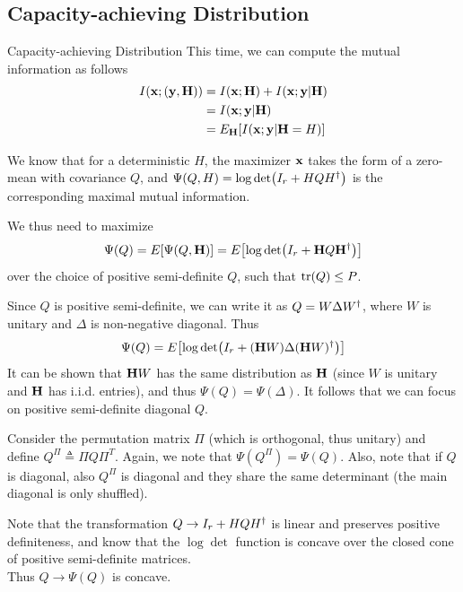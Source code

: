\subsection{Capacity-achieving Distribution}
\begin{frame}[allowframebreaks]{Capacity-achieving Distribution}
This time, we can compute the mutual information as follows
\begin{align*}
\begin{split}
I(\vb{x;(y,H)}) &= I(\vb{x;H}) + I(\vb{x;y|H})\\
&= I(\vb{x;y|H})\\
&= \Exp[\vb{H}]{I(\vb{x;y|H}=H)}
\end{split}
\end{align*}

We know that for a deterministic $H$, the maximizer $\vb{x}$ takes the form of a zero-mean \cscg{} with covariance $Q$, and $\Psi(Q,H) = \log\det(I_r + HQ\herm{H})$ is the corresponding maximal mutual information.

\medskip
We thus need to maximize
$$\Psi(Q) = \Exp{\Psi(Q,\vb{H})} = \Exp{\log\det(I_r + \vb{H}Q\herm{\vb{H}})}$$
over the choice of positive semi-definite $Q$, such that $\tr(Q)\leq P$.

\framebreak

Since $Q$ is positive semi-definite, we can write it as $Q = W\Delta\herm{W}$, where $W$ is unitary and $\Delta$ is non-negative diagonal. Thus
$$\Psi(Q) = \Exp{\log\det(I_r + (\vb{H}W)\Delta\herm{(\vb{H}W)})}$$
It can be shown that $\vb{H}W$ has the same distribution as $\vb{H}$ (since $W$ is unitary and $\vb{H}$ has i.i.d. entries), and thus $\Psi(Q)=\Psi(\Delta)$. It follows that we can focus on positive semi-definite diagonal $Q$.

\medskip
Consider the permutation matrix $\Pi$ (which is orthogonal, thus unitary) and define $Q^\Pi \triangleq \Pi Q \Pi^T$. Again, we note that $\Psi(Q^\Pi) = \Psi(Q)$. Also, note that if $Q$ is diagonal, also $Q^\Pi$ is diagonal and they share the same determinant (the main diagonal is only shuffled).

\framebreak

Note that the transformation $Q\rightarrow I_r+HQ\herm{H}$ is linear and preserves positive definiteness, and know that the $\log\det$ function is concave over the closed cone of positive semi-definite matrices.\\
Thus $Q\rightarrow \Psi(Q)$ is concave.


\end{frame}
